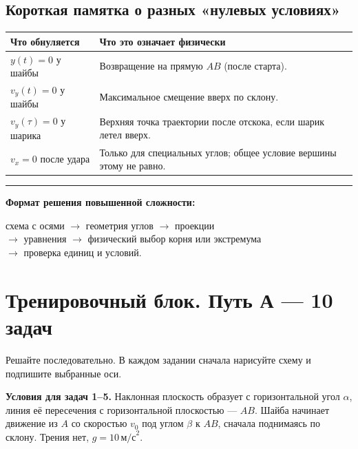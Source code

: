 \documentclass[a4paper,12pt]{article}
\newcommand{\key}[1]{\textcolor{darkaccent}{\textbf{#1}}}
\newcommand{\separate}{\par\vspace{0.25em}\noindent\color{accent}\rule{\linewidth}{0.5pt}\color{black}\par\vspace{0.25em}}
\newcommand{\secstyle}[1]{\section*{\textcolor{darkaccent}{#1}}}
\newcommand{\smallhead}[1]{\subsection*{\textcolor{darkaccent}{#1}}}
\newcommand{\tagline}[1]{\begin{center}\small\color{softgray}#1\end{center}}
\begin{document}
\smallhead{Короткая памятка о разных «нулевых условиях»}
\renewcommand{\arraystretch}{1.35}
\begin{tabularx}{\linewidth}{@{}p{.28\linewidth}X@{}}
\toprule
\textbf{Что обнуляется} & \textbf{Что это означает физически} \\
\midrule
\(y(t)=0\) у шайбы & Возвращение на прямую \(AB\) (после старта).\\
\(v_y(t)=0\) у шайбы & Максимальное смещение вверх по склону.\\
\(v_y(\tau)=0\) у шарика & Верхняя точка траектории после отскока, если шарик летел вверх.\\
\(v_x=0\) после удара & Только для специальных углов; общее условие вершины этому не равно.\\
\bottomrule
\end{tabularx}
\separate
\key{Формат решения повышенной сложности:}\par\begin{center}\small
схема с осями $\longrightarrow$ геометрия углов $\longrightarrow$ проекции\\
$\longrightarrow$ уравнения $\longrightarrow$ физический выбор корня или экстремума\\
$\longrightarrow$ проверка единиц и условий.
\end{center}

\clearpage
\secstyle{Тренировочный блок. Путь А --- 10 задач}
\tagline{Решайте последовательно. В каждом задании сначала нарисуйте схему и подпишите выбранные оси.}
\textbf{Условия для задач 1--5.} Наклонная плоскость образует с горизонтальной угол \(\alpha\), линия её пересечения с горизонтальной плоскостью --- \(AB\). Шайба начинает движение из \(A\) со скоростью \(v_0\) под углом \(\beta\) к \(AB\), сначала поднимаясь по склону. Трения нет, \(g=10\,\text{м/с}^2\).
\end{document}
